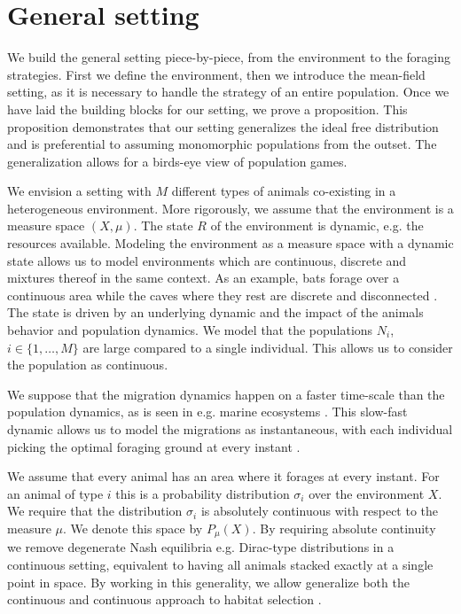 \section{General setting}
\label{sec:general_setting}
We build the general setting piece-by-piece, from the environment to the foraging strategies. First we define the environment, then we introduce the mean-field setting, as it is necessary to handle the strategy of an entire population. Once we have laid the building blocks for our setting, we prove a proposition. This proposition demonstrates that our setting generalizes the ideal free distribution and is preferential to assuming monomorphic populations from the outset. The generalization allows for a birds-eye view of population games.

We envision a setting with $M$ different types of animals co-existing in a heterogeneous environment.  More rigorously, we assume that the environment is a measure space $(X,\mu)$. The state $R$ of the environment is dynamic, e.g. the resources available. Modeling the environment as a measure space with a dynamic state allows us to model environments which are continuous, discrete and mixtures thereof in the same context. As an example, bats forage over a continuous area while the caves where they rest are discrete and disconnected \citep{collet2019algorithmic}. The state is driven by an underlying dynamic and the impact of the animals behavior and population dynamics. We model that the populations $N_i$, $i\in \{1,\dots,M\}$  are large compared to a single individual. This allows us to consider the population as continuous. %


We suppose that the migration dynamics happen on a faster time-scale than the population dynamics, as is seen in e.g. marine ecosystems \citep{iwasa1982vertical}. This slow-fast dynamic allows us to model the migrations as instantaneous, with each individual picking the optimal foraging ground at every instant \citep{kvrivan2013behavioral, cressman2006migration}.


We assume that every animal has an area where it forages at every instant. For an animal of type $i$ this is a probability distribution $\sigma_i$ over the environment $X$. We require that the distribution $\sigma_i$ is absolutely continuous with respect to the measure $\mu$. We denote this space by $P_{\mu}(X)$. By requiring absolute continuity we remove degenerate Nash equilibria e.g. Dirac-type distributions in a continuous setting, equivalent to having all animals stacked exactly at a single point in space. By working in this generality, we allow generalize both the continuous and continuous approach to habitat selection \citep{fretwell1969territorial, broom2013game, verticalmigration}.


